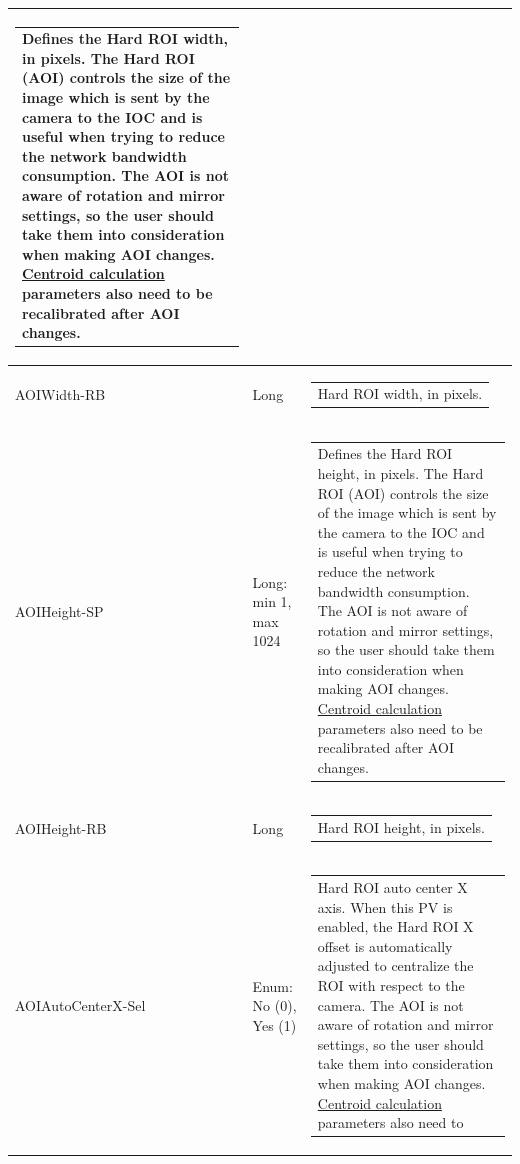 \documentclass[openany]{article}
\begin{document}
\begin{longtable}{| m{3.0cm} m{4.5cm}  m{7.0cm} |}
\begin{tabular}{@{}m{6cm}@{}}
                Defines the Hard ROI width, in pixels. The Hard ROI (AOI) controls the size
                of the image which is sent by the camera to the IOC and is useful when
                trying to reduce the network bandwidth consumption. The AOI is not aware of
                rotation and mirror settings, so the user should take them into
                consideration when making AOI changes. \hyperref[sec:centroid-calc]{Centroid
                calculation} parameters also need to be recalibrated after AOI changes.
            \end{tabular} \\ \hline
        AOIWidth-RB & Long & \begin{tabular}{@{}m{6cm}@{}}
                Hard ROI width, in pixels.
            \end{tabular} \hypertarget{pv:hard-roi-height}{}\\ \hline
        AOIHeight-SP & Long: min 1, max 1024 & \begin{tabular}{@{}m{6cm}@{}}
                Defines the Hard ROI height, in pixels. The Hard ROI (AOI) controls the size
                of the image which is sent by the camera to the IOC and is useful when
                trying to reduce the network bandwidth consumption. The AOI is not aware of
                rotation and mirror settings, so the user should take them into
                consideration when making AOI changes. \hyperref[sec:centroid-calc]{Centroid
                calculation} parameters also need to be recalibrated after AOI changes.
            \end{tabular} \\ \hline
        AOIHeight-RB & Long & \begin{tabular}{@{}m{6cm}@{}}
                Hard ROI height, in pixels.
            \end{tabular} \hypertarget{pv:hard-roi-auto-center-x}{}\\ \hline
        AOIAutoCenterX-Sel & Enum: No (0), Yes (1) & \begin{tabular}{@{}m{6cm}@{}}
                Hard ROI auto center X axis. When this PV is enabled, the Hard ROI X offset 
                is automatically adjusted to centralize the ROI with respect to the camera.
                The AOI is not aware of rotation and mirror settings, so the user should
                take them into consideration when making AOI changes.
                \hyperref[sec:centroid-calc]{Centroid calculation} parameters also need to

\end{tabular}
\end{longtable}
\end{document}
